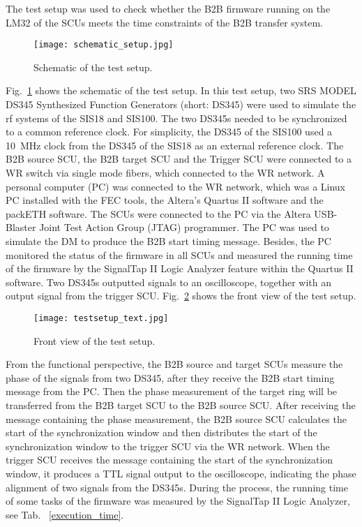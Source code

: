 The test setup was used to check whether the B2B firmware running on the LM32 of the SCUs meets the time constraints of the B2B transfer system.  

\begin{figure}[!htb]
   \centering   
   \texttt{[image: schematic\_setup.jpg]}
   \caption{Schematic of the test setup.}
   \label{setup}
\end{figure}
Fig.~\ref{setup} shows the schematic of the test setup. In this test setup, two SRS MODEL DS345 Synthesized Function Generators (short: DS345) were used to simulate the rf systems of the SIS18 and SIS100. The two DS345s needed to be synchronized to a common reference clock. For simplicity, the DS345 of the SIS100 used a \SI{10}{\MHz} clock from the DS345 of the SIS18 as an external reference clock. The B2B source SCU, the B2B target SCU and the Trigger SCU were connected to a WR switch via single mode fibers, which connected to the WR network. A personal computer (PC) was connected to the WR network, which was a Linux PC installed with the FEC tools, the Altera's Quartus II software and the packETH software. The SCUs were connected to the PC via the Altera USB-Blaster Joint Test Action Group (JTAG) programmer. The PC was used to simulate the DM to produce the B2B start timing message. Besides, the PC monitored the status of the firmware in all SCUs and measured the running time of the firmware by the SignalTap II Logic Analyzer feature within the Quartus II software. Two DS345s outputted signals to an oscilloscope, together with an output signal from the trigger SCU. Fig.~\ref{testsetup_text} shows the front view of the test setup. 
\begin{figure}[!htb]
   \centering   
   \texttt{[image: testsetup\_text.jpg]}
   \caption{Front view of the test setup.}
   \label{testsetup_text}
\end{figure}

From the functional perspective, the B2B source and target SCUs measure the phase of the signals from two DS345, after they receive the B2B start timing message from the PC. Then the phase measurement of the target ring will be transferred from the B2B target SCU to the B2B source SCU. After receiving the message containing the phase measurement, the B2B source SCU calculates the start of the synchronization window and then distributes the start of the synchronization window to the trigger SCU via the WR network. When the trigger SCU receives the message containing the start of the synchronization window, it produces a TTL signal output to the oscilloscope, indicating the phase alignment of two signals from the DS345s. During the process, the running time of some tasks of the firmware was measured by the SignalTap II Logic Analyzer, see Tab. ~\ref{execution_time}.

